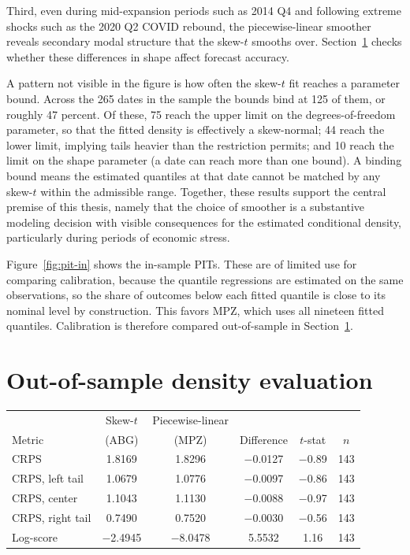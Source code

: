 \documentclass[12pt]{report} %
\begin{document}
Third, even during mid-expansion periods such as 2014 Q4 and following extreme shocks such as the 2020 Q2 COVID rebound, the piecewise-linear smoother reveals secondary modal structure that the skew-$t$ smooths over. Section~\ref{sec:oos} checks whether these differences in shape affect forecast accuracy.

A pattern not visible in the figure is how often the skew-$t$ fit reaches a parameter bound. Across the 265 dates in the sample the bounds bind at 125 of them, or roughly 47 percent. Of these, 75 reach the upper limit on the degrees-of-freedom parameter, so that the fitted density is effectively a skew-normal; 44 reach the lower limit, implying tails heavier than the restriction permits; and 10 reach the limit on the shape parameter (a date can reach more than one bound). A binding bound means the estimated quantiles at that date cannot be matched by any skew-$t$ within the admissible range. Together, these results support the central premise of this thesis, namely that the choice of smoother is a substantive modeling decision with visible consequences for the estimated conditional density, particularly during periods of economic stress.

Figure~\ref{fig:pit-in} shows the in-sample PITs. These are of limited use for comparing calibration, because the quantile regressions are estimated on the same observations, so the share of outcomes below each fitted quantile is close to its nominal level by construction. This favors MPZ, which uses all nineteen fitted quantiles. Calibration is therefore compared out-of-sample in Section~\ref{sec:oos}.

\section{Out-of-sample density evaluation}
\label{sec:oos}

\begin{table}[htbp]
	{\small
	\begin{tabular}{lccccc}
		\toprule
		& Skew-$t$ & Piecewise-linear & & & \\
		Metric & (ABG) & (MPZ) & Difference & $t$-stat & $n$ \\
		\midrule
		CRPS             & 1.8169    & 1.8296    & $-$0.0127 & $-$0.89 & 143 \\
		CRPS, left tail  & 1.0679    & 1.0776    & $-$0.0097 & $-$0.86 & 143 \\
		CRPS, center     & 1.1043    & 1.1130    & $-$0.0088 & $-$0.97 & 143 \\
		CRPS, right tail & 0.7490    & 0.7520    & $-$0.0030 & $-$0.56 & 143 \\
		Log-score        & $-$2.4945 & $-$8.0478 & 5.5532    & 1.16    & 143 \\
		\bottomrule
	\end{tabular}}
\end{table}
\end{document}
